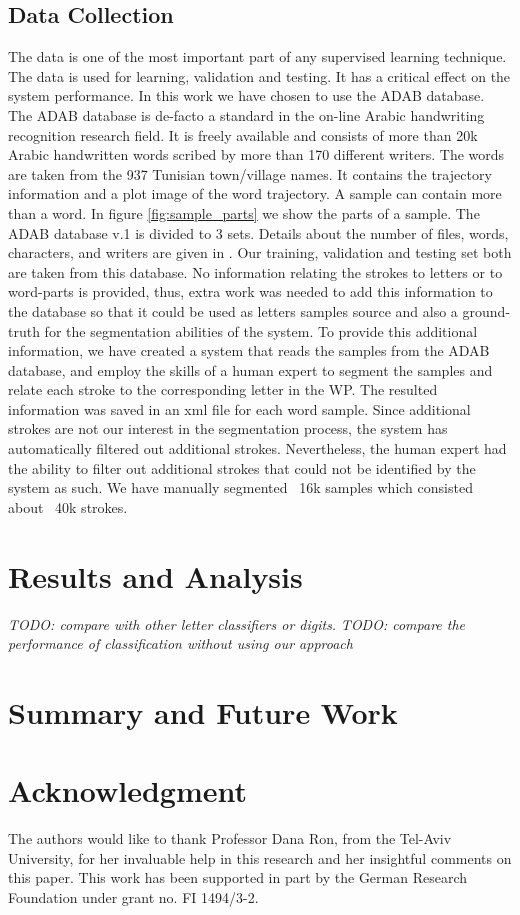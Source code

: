 \documentclass[10pt, conference, compsocconf]{IEEEtran}
\theoremstyle{definition}
\begin{document}
\subsection{Data Collection}
The data is one of the most important part of any supervised learning technique. The data is used for learning, validation and testing. It has a critical effect on the system performance. In this work we have chosen to use the ADAB database. The ADAB database is de-facto a standard in the on-line Arabic handwriting recognition research field. It is freely available and consists of more than 20k Arabic handwritten words scribed by more than 170 different writers. The words are taken from the 937 Tunisian town/village names. It contains the trajectory information and a plot image of the word trajectory. A sample can contain more than a word. In figure \ref{fig:sample_parts} we show the parts of a sample. The ADAB database v.1 is divided to 3 sets. Details about the number of files, words, characters, and writers are given in \cite{el2009icdar}. Our training, validation and testing set both are taken from this database. 
No information relating the strokes to letters or to word-parts is provided, thus, extra work was needed to add this information to the database so that it could be used as letters samples source and also a ground-truth for the segmentation abilities of the system. To provide this additional information, we have created a system that reads the samples from the ADAB database, and employ the skills of a human expert to segment the samples and relate each stroke to the corresponding letter in the WP. The resulted information was saved in an xml file for each word sample. Since additional strokes are not our interest in the segmentation process, the system has automatically filtered out additional strokes. Nevertheless, the human expert had the ability to filter out additional strokes that could not be identified by the system as such. We have manually segmented ~16k samples which consisted about ~40k strokes. 

\section{Results and Analysis}

\emph{TODO: compare with other letter classifiers or digits.}
\emph{TODO: compare the performance of classification without using our approach}

\section{Summary and Future Work}

\section*{Acknowledgment}
The authors would like to thank Professor Dana Ron, from the Tel-Aviv University, for her invaluable help in this research and her insightful comments on this paper. This work has been supported in part by the German Research Foundation under grant no. FI 1494/3-2.



\end{document}

